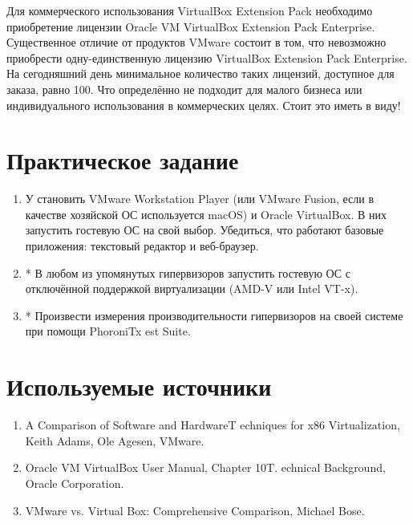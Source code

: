 \documentclass[14pt, a4paper]{article}
\begin{document}
Для коммерческого использования VirtualBox Extension Pack необходимо приобретение лицензии
Oracle VM VirtualBox Extension Pack Enterprise. Существенное отличие от продуктов VMware состоит в
том, что невозможно приобрести одну-единственную лицензию VirtualBox Extension Pack Enterprise.
На сегодняшний день минимальное количество таких лицензий, доступное для заказа, равно 100. Что
определённо не подходит для малого бизнеса или индивидуального использования в коммерческих
целях. Стоит это иметь в виду!

\section*{Практическое задание}

\begin{enumerate}
    \item У становить VMware Workstation Player (или VMware Fusion, если в качестве хозяйской ОС
    используется macOS) и Oracle VirtualBox. В них запустить гостевую ОС на свой выбор.
    Убедиться, что работают базовые приложения: текстовый редактор и веб-браузер.
    \item * В любом из упомянутых гипервизоров запустить гостевую ОС с отключённой поддержкой
    виртуализации (AMD-V или Intel VT-x).
    \item * Произвести измерения производительности гипервизоров на своей системе при помощи
    PhoroniTx est Suite.
\end{enumerate}

\section*{Используемые источники}

\begin{enumerate}
    \item A Comparison of Software and HardwareT echniques for x86 Virtualization, Keith Adams, Ole
    Agesen, VMware.
    \item Oracle VM VirtualBox User Manual, Chapter 10T. echnical Background, Oracle Corporation.
    \item VMware vs. Virtual Box: Comprehensive Comparison, Michael Bose.
\end{enumerate}
\end{document}
